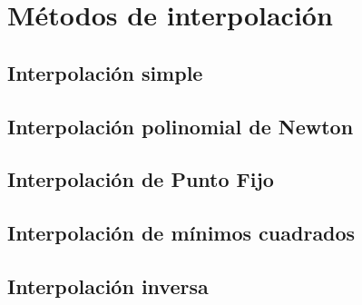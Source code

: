\chapter{Métodos de interpolación}

\section{Interpolación simple}
\section{Interpolación polinomial de Newton}
\section{Interpolación de Punto Fijo}
\section{Interpolación de mínimos cuadrados}
\section{Interpolación inversa}
